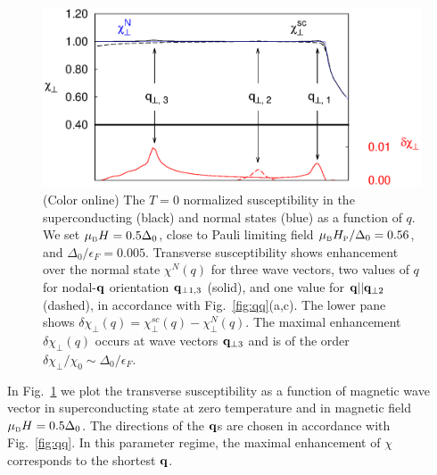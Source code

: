 \documentclass[aps,prl,twocolumn,showpacs,amsmath,amssymb]{revtex4-1}
\begin{document}
\begin{figure}[t]
\includegraphics[width=0.95\linewidth]{Fig3.eps}
\caption{
	\label{fig:chi_enh}
	(Color online)
	The $T=0$ normalized susceptibility in the superconducting (black) and normal states (blue) as a function of $q$. 
We set $\mu_{\mbox{\tiny B}} H = 0.5\Delta_0$, close to Pauli limiting field $\mu_{\mbox{\tiny B}} H_{\mbox{\tiny P}}/\Delta_0 = 0.56$, 
and $\Delta_0/\epsilon_F = 0.005$. Transverse susceptibility shows enhancement over the normal state $\chi^N(q)$ 
for three wave vectors, two values of $q$ for nodal-${\bf q}$ orientation ${\bf q}_{\perp 1,3}$ (solid), 
and one value for ${\bf q} || {\bf q}_{\perp 2}$ (dashed), 
in accordance with Fig.~\ref{fig:qq}(a,c). 
The lower pane shows $\delta\chi_\perp(q) = \chi_\perp^{sc}(q) - \chi_\perp^{N}(q)$. 
%
%
The maximal enhancement $\delta \chi_{\perp}(q)$ occurs at wave vectors 
${\bf q}_{\perp 3}$ and is of the 
order $\delta \chi_\perp/\chi_0 \sim \Delta_0/\epsilon_F$. 
}
 \end{figure}
  

In Fig.~\ref{fig:chi_enh} we plot the transverse susceptibility as a function of magnetic wave vector 
in superconducting state at zero temperature and in 
magnetic field $\mu_{\mbox{\tiny B}} H = 0.5\Delta_0$. 
The directions of the ${\bf q}$s are chosen in accordance with Fig.~\ref{fig:qq}.
In this parameter regime, the maximal enhancement of $\chi$ corresponds to the shortest ${\bf q}$.


\end{document}
